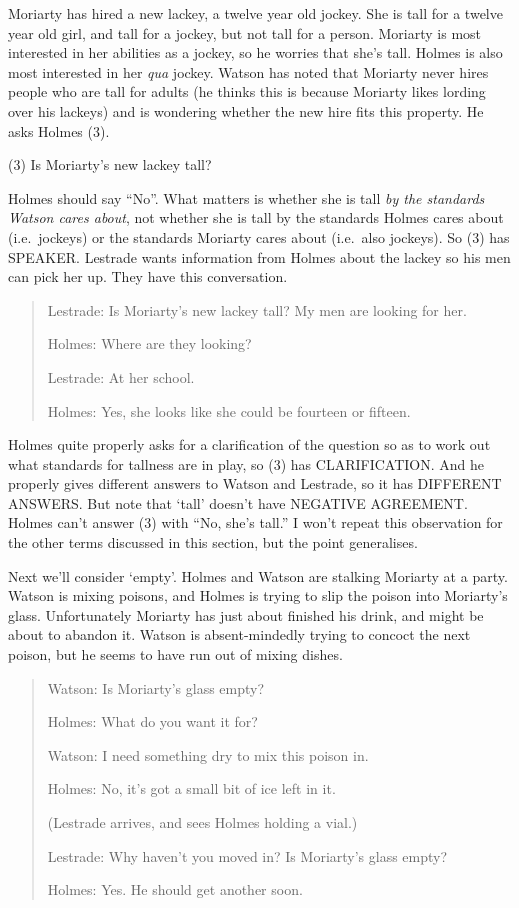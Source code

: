 \documentclass[
  10pt,
  letterpaper,
  DIV=11,
  numbers=noendperiod,
  twoside]{scrartcl}
\begin{document}
Moriarty has hired a new lackey, a twelve year old jockey. She is tall
for a twelve year old girl, and tall for a jockey, but not tall for a
person. Moriarty is most interested in her abilities as a jockey, so he
worries that she's tall. Holmes is also most interested in her
\emph{qua} jockey. Watson has noted that Moriarty never hires people who
are tall for adults (he thinks this is because Moriarty likes lording
over his lackeys) and is wondering whether the new hire fits this
property. He asks Holmes (3).

(3) Is Moriarty's new lackey tall?

Holmes should say ``No''. What matters is whether she is tall \emph{by
the standards Watson cares about}, not whether she is tall by the
standards Holmes cares about (i.e.~jockeys) or the standards Moriarty
cares about (i.e.~also jockeys). So (3) has SPEAKER. Lestrade wants
information from Holmes about the lackey so his men can pick her up.
They have this conversation.

\begin{quote}
Lestrade: Is Moriarty's new lackey tall? My men are looking for her.

Holmes: Where are they looking?

Lestrade: At her school.

Holmes: Yes, she looks like she could be fourteen or fifteen.
\end{quote}

Holmes quite properly asks for a clarification of the question so as to
work out what standards for tallness are in play, so (3) has
CLARIFICATION. And he properly gives different answers to Watson and
Lestrade, so it has DIFFERENT ANSWERS. But note that `tall' doesn't have
NEGATIVE AGREEMENT. Holmes can't answer (3) with ``No, she's tall.'' I
won't repeat this observation for the other terms discussed in this
section, but the point generalises.

Next we'll consider `empty'. Holmes and Watson are stalking Moriarty at
a party. Watson is mixing poisons, and Holmes is trying to slip the
poison into Moriarty's glass. Unfortunately Moriarty has just about
finished his drink, and might be about to abandon it. Watson is
absent-mindedly trying to concoct the next poison, but he seems to have
run out of mixing dishes.

\begin{quote}
Watson: Is Moriarty's glass empty?

Holmes: What do you want it for?

Watson: I need something dry to mix this poison in.

Holmes: No, it's got a small bit of ice left in it.

(Lestrade arrives, and sees Holmes holding a vial.)

Lestrade: Why haven't you moved in? Is Moriarty's glass empty?

Holmes: Yes. He should get another soon.
\end{quote}
\end{document}
